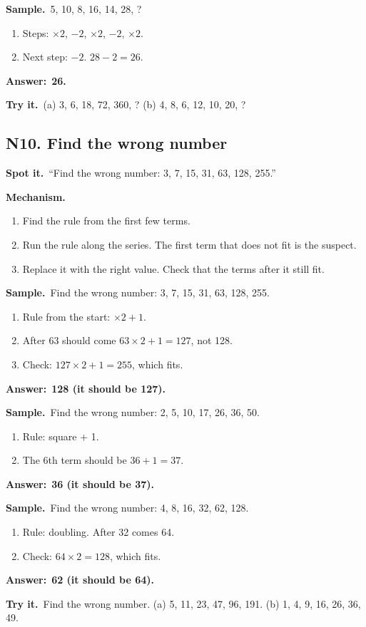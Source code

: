 \documentclass[11pt,a4paper]{article}
\let\oldsubsection\subsection
\renewcommand{\subsection}{\needspace{9\baselineskip}\oldsubsection}
\newcommand{\spot}{\textbf{\color{ember}Spot it.}\ }
\newcommand{\mech}{\textbf{\color{ember}Mechanism.}\ }
\newif\ifkeepsamp
\newcommand{\ans}[1]{\par\nopagebreak\noindent\textbf{\color{ember}Answer:}\ \textbf{#1}\par}
\newcommand{\samp}{\ifkeepsamp\needspace{4\baselineskip}\fi\textbf{\color{ember}Sample.}\ }
\newcommand{\tryit}[1]{\textbf{\color{ember}Try it.}\ #1}
\begin{document}
\samp 5, 10, 8, 16, 14, 28, ?
\begin{enumerate}
\item Steps: $\times 2$, $-2$, $\times 2$, $-2$, $\times 2$.
\item Next step: $-2$. $28 - 2 = 26$.
\end{enumerate}
\ans{26.}

\tryit (a) 3, 6, 18, 72, 360, ? (b) 4, 8, 6, 12, 10, 20, ?

\subsection{N10. Find the wrong number}
\spot ``Find the wrong number: 3, 7, 15, 31, 63, 128, 255.''

\mech
\begin{enumerate}
\item Find the rule from the first few terms.
\item Run the rule along the series. The first term that does not fit is the suspect.
\item Replace it with the right value. Check that the terms after it still fit.
\end{enumerate}

\samp Find the wrong number: 3, 7, 15, 31, 63, 128, 255.
\begin{enumerate}
\item Rule from the start: $\times 2 + 1$.
\item After 63 should come $63 \times 2 + 1 = 127$, not 128.
\item Check: $127 \times 2 + 1 = 255$, which fits.
\end{enumerate}
\ans{128 (it should be 127).}

\samp Find the wrong number: 2, 5, 10, 17, 26, 36, 50.
\begin{enumerate}
\item Rule: square + 1.
\item The 6th term should be $36 + 1 = 37$.
\end{enumerate}
\ans{36 (it should be 37).}

\samp Find the wrong number: 4, 8, 16, 32, 62, 128.
\begin{enumerate}
\item Rule: doubling. After 32 comes 64.
\item Check: $64 \times 2 = 128$, which fits.
\end{enumerate}
\ans{62 (it should be 64).}

\tryit Find the wrong number. (a) 5, 11, 23, 47, 96, 191. (b) 1, 4, 9, 16, 26, 36, 49.
\end{document}

